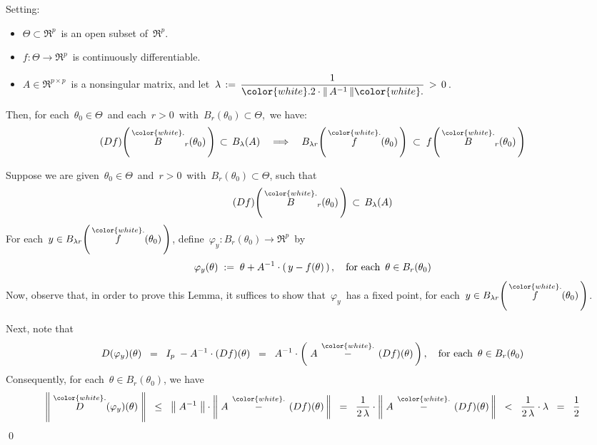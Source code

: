 \begin{lemma}
\mbox{}\vskip 0.1cm
\noindent
Setting:
\begin{itemize}
\item
	$\Theta \subset \Re^{p}$\, is an open subset of \,$\Re^{p}$.
\item
	$f : \Theta \longrightarrow \Re^{p}$\, is continuously differentiable.
\item
	$A \in \Re^{p \times p}$\, is a nonsingular matrix, and let
	\,$\lambda \, := \, \dfrac{1}{{\color{white}.}2\cdot\Vert\,A^{-1}\,\Vert{\color{white}.}} \, > \, 0$\,.
\end{itemize}
Then, for each \,$\theta_{0} \in \Theta$\, and
each \,$r > 0$\, with \,$B_{r}(\theta_{0}) \subset \Theta$,\, we have:
\begin{equation*}
(Df)\!\left(\,\overset{{\color{white}.}}{B}_{r}(\theta_{0})\,\right)
\,\subset\, B_{\lambda}(A) 
\quad\Longrightarrow\quad
	B_{\lambda r}\!\left(\,\overset{{\color{white}.}}{f}(\theta_{0})\,\right)
	\; \subset \;
	f\!\left(\,\overset{{\color{white}.}}{B}_{r}(\theta_{0})\,\right)
\end{equation*}
\end{lemma}
\proof
Suppose we are given
\,$\theta_{0} \in \Theta$\, and \,$r > 0$\, with \,$B_{r}(\theta_{0}) \subset \Theta$, such that
\begin{equation*}
(Df)\!\left(\,\overset{{\color{white}.}}{B}_{r}(\theta_{0})\,\right)
\,\subset\, B_{\lambda}(A) 
\end{equation*}
For each \,$y \in B_{\lambda r}\!\left(\,\overset{{\color{white}.}}{f}(\theta_{0})\,\right)$,
define \,$\varphi_{y} : B_{r}(\theta_{0}) \longrightarrow \Re^{p}$\, by
\begin{equation*}
\varphi_{y}(\theta) \; := \; \theta + A^{-1} \cdot (\,y - f(\theta)\,)\,,
\quad
\textnormal{for each \,$\theta \in B_{r}(\theta_{0})$}
\end{equation*}
Now, observe that, in order to prove this Lemma, it suffices to show that
\,$\varphi_{y}$\, has a fixed point, for each
\,$y \in B_{\lambda r}\!\left(\,\overset{{\color{white}.}}{f}(\theta_{0})\,\right)$.

\vskip 0.5cm
\noindent
Next, note that
\begin{equation*}
D(\varphi_{y})(\theta)
\;\; = \;\;
	I_{p} \; - A^{-1} \cdot (Df)(\theta)
\;\; = \;\;
	A^{-1} \cdot \left(\; A \,\overset{{\color{white}.}}{-}\, (Df)(\theta) \,\right),
\quad
\textnormal{for each \,$\theta \in B_{r}(\theta_{0})$}
\end{equation*}
Consequently, for each \,$\theta \in B_{r}(\theta_{0})$, we have
\begin{equation*}
\left\Vert\; \overset{{\color{white}.}}{D}(\varphi_{y})(\theta) \;\right\Vert
\;\; \leq \;\;
	\left\Vert\; A^{-1} \;\right\Vert
	\cdot
	\left\Vert\; A \,\overset{{\color{white}.}}{-}\, (Df)(\theta) \,\right\Vert
\;\; = \;\;
	\dfrac{1}{2\,\lambda}
	\cdot
	\left\Vert\; A \,\overset{{\color{white}.}}{-}\, (Df)(\theta) \,\right\Vert
\;\; < \;\;
	\dfrac{1}{2\,\lambda} \cdot \lambda
\;\; = \;\;
	\dfrac{1}{2}
\end{equation*}
\qed


\renewcommand{\theenumi}{\roman{enumi}}
\renewcommand{\labelenumi}{\textnormal{(\theenumi)}$\;\;$}

